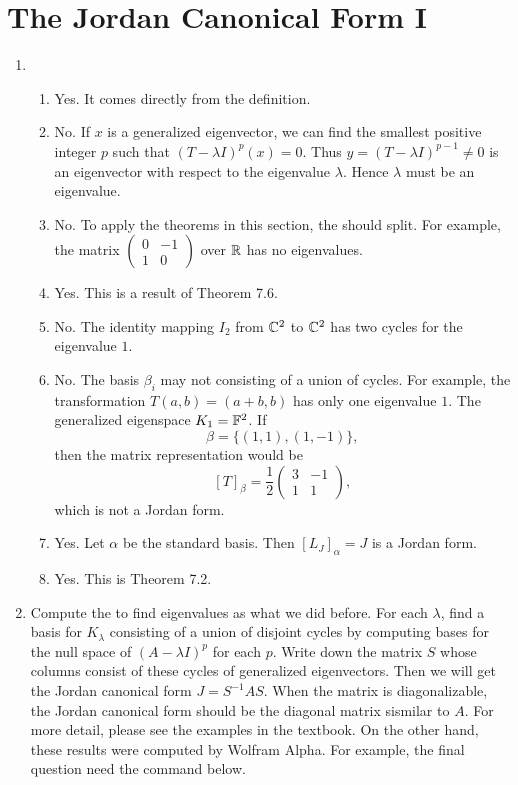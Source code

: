 \section{The Jordan Canonical Form I}
\begin{enumerate}
\item \begin{enumerate}
\item Yes. It comes directly from the definition.
\item No. If $x$ is a generalized eigenvector, we can find the smallest positive integer $p$ such that $(T-\lambda I)^p(x)=0$. Thus $y=(T-\lambda I)^{p-1}\neq 0$ is an eigenvector with respect to the eigenvalue $\lambda$. Hence $\lambda $ must be an eigenvalue.
\item No. To apply the theorems in this section, the \charpoly{} should split. For example, the matrix $\begin{pmatrix}0&-1\\1&0\end{pmatrix}$ over $\mathbb{R}$ has no eigenvalues.
\item Yes. This is a result of Theorem 7.6.
\item No. The identity mapping $I_2$ from $\mathbb{C}^2$ to $\mathbb{C}^2$ has two cycles for the eigenvalue $1$.
\item No. The basis $\beta_i$ may not consisting of a union of cycles. For example, the transformation $T(a,b)=(a+b,b)$ has only one eigenvalue $1$. The generalized eigenspace $K_1=\mathbb{F}^2$. If 
\[\beta=\{(1,1),(1,-1)\},\]
then the matrix representation would be 
\[[T]_{\beta}=\frac{1}{2}\begin{pmatrix}3&-1\\1&1\end{pmatrix},\]
which is not a Jordan form.
\item Yes. Let $\alpha $ be the standard basis. Then $[L_J]_{\alpha}=J$ is a Jordan form.
\item Yes. This is Theorem 7.2.
\end{enumerate}
\item Compute the \charpoly{} to find eigenvalues as what we did before. For each $\lambda$, find a basis for $K_{\lambda}$ consisting of a union of disjoint cycles by computing bases for the null space of $(A-\lambda I)^p$ for each $p$. Write down the matrix $S$ whose columns consist of these cycles of generalized eigenvectors. Then we will get the Jordan canonical form $J=S^{-1}AS$. When the matrix is diagonalizable, the Jordan canonical form should be the diagonal matrix sismilar to $A$. For more detail, please see the examples in the textbook. On the other hand, these results were computed by Wolfram Alpha. For example, the final question need the command below.

\end{enumerate}
